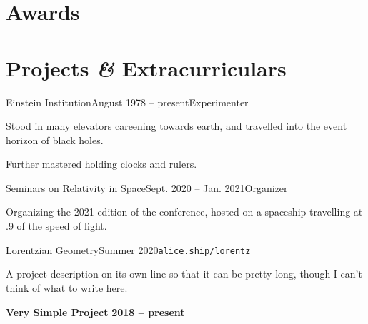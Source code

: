 \documentclass{resume}
\begin{document}
\noindent
\renewcommand{\refname}{Publications}   %
\nocite{*}
\sectionlineskip

\section{Awards} 
\begin{content}
    
\sectionlineskip
\end{content}

\section{Projects \textbf{\em\&} Extracurriculars} 
\begin{content}
    
    \begin{position}{Einstein Institution}{August 1978 -- present}{Experimenter}{}{}
        \item Stood in many elevators careening towards earth, and travelled into the event horizon of black holes. 
        \item Further mastered holding clocks and rulers.
    \end{position}
    
    \begin{position}{Seminars on Relativity in Space}{Sept. 2020 -- Jan. 2021}{Organizer}{}{}
    \item Organizing the 2021 edition of the conference, hosted on a spaceship travelling at .9 of the speed of light.
    \end{position}
    
    \begin{position}{Lorentzian Geometry}{Summer 2020}{\normalfont\href{https://alice.ship/lorentz}{\texttt{alice.ship/lorentz}}}{}{}
    \item A project description on its own line so that it can be pretty long, though I can't think of what to write here.  
    \end{position}
    
    {\bf Very Simple Project} 
    \hfill {\bf 2018 -- present}

\sectionlineskip    
\end{content}
\end{document}

